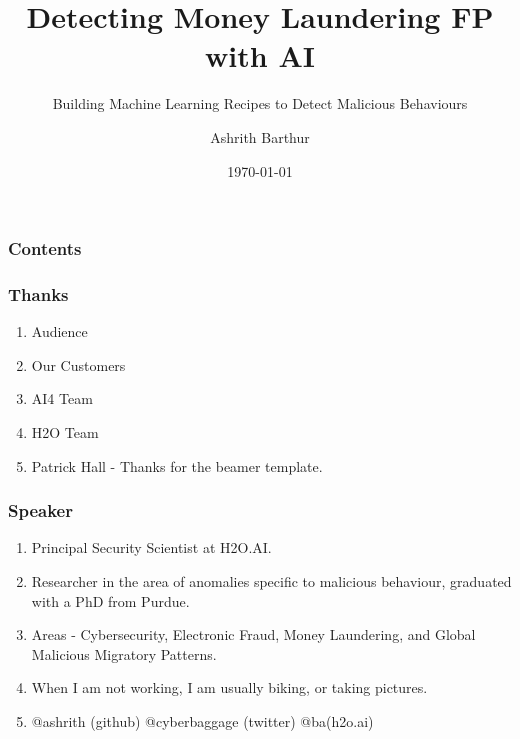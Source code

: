 \documentclass[11pt,
               aspectratio=169,
               hyperref={colorlinks}
               ]{beamer}
\author{Ashrith Barthur}
\title{Detecting Money Laundering FP with AI}
\subtitle{Building Machine Learning Recipes to Detect Malicious Behaviours}
\institute{\href{https://www.h2o.ai}{H\textsubscript{2}O.ai}}
\date{\today}
\begin{document}
	
	\maketitle
	
	\begin{frame}
	
		\frametitle{Contents}
		
		\tableofcontents{}
		
	\end{frame}

	\begin{frame}
		\frametitle{Thanks}
		\begin{enumerate}
			\item Audience
			\item Our Customers
			\item AI4 Team
			\item H2O Team
			\item Patrick Hall - Thanks for the beamer template.
		\end{enumerate}
	\end{frame}

	\begin{frame}
		\frametitle{Speaker}
		\begin{enumerate}
			\item Principal Security Scientist at H2O.AI.
			\item Researcher in the area of anomalies specific to malicious behaviour, graduated with a PhD from Purdue. 
			\item Areas -  Cybersecurity, Electronic Fraud, Money Laundering, and Global Malicious Migratory Patterns.
			\item When I am not working, I am usually biking, or taking pictures. 
			\item @ashrith (github) @cyberbaggage (twitter) @ba(h2o.ai)
		\end{enumerate}
	\end{frame}
\end{document}
